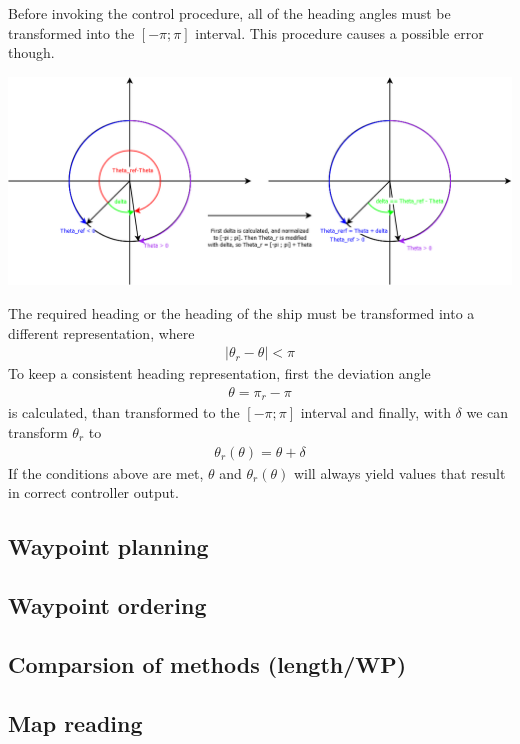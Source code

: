 Before invoking the control procedure, all of the heading angles must be transformed into the $[-\pi ; \pi]$ interval.
This procedure causes a possible error though.

\includegraphics[width=\textwidth]{img/Headings}

The required heading or the heading of the ship must be transformed into a different representation, where 
\begin{align}
|\theta_{r}-\theta| < \pi
\end{align}
To keep a consistent heading representation, first the deviation angle 
\begin{align}
\theta = \pi_{r}-\pi
\end{align} is calculated, than transformed to the $[-\pi;\pi]$ interval and finally, with $\delta$ we can transform $\theta_{r}$ to 
\begin{align}
\theta_{r}(\theta) = \theta + \delta
\end{align}
If the conditions above are met, $\theta$ and $\theta_r(\theta)$ will always yield values that result in correct controller output.

\subsection{Waypoint planning}

\subsection{Waypoint ordering}

\subsection{Comparsion of methods (length/WP)}

\subsection{Map reading}